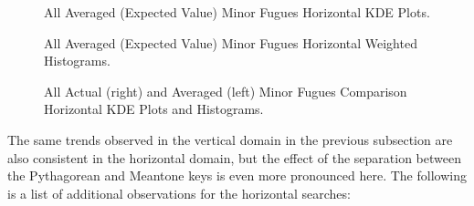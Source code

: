 \begin{figure}[H]
\vspace{1.5em}
    \centering
    \caption{All Averaged (Expected Value) Minor Fugues Horizontal KDE Plots. }
\end{figure}


\begin{figure}[H]
\vspace{1.5em}
    \centering
    \caption{All Averaged (Expected Value) Minor Fugues Horizontal Weighted Histograms. }
\end{figure}
    \begin{center}
    \end{center}
    


\begin{figure}[H]
\vspace{1.5em}
    \centering
    \caption[Actual and Averaged Minor Fugues Comparison Horizontal KDE Plots and Histograms. ]{All Actual (right) and Averaged (left) Minor Fugues Comparison Horizontal KDE Plots and Histograms.}
\end{figure}    The same trends observed in the vertical domain in the previous
subsection are also consistent in the horizontal domain, but the effect
of the separation between the Pythagorean and Meantone keys is even more
pronounced here. The following is a list of additional observations for
the horizontal searches:

